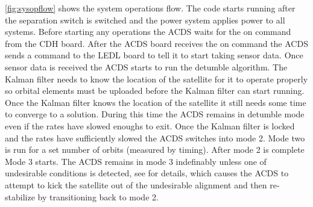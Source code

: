 \autoref{fig:sysopflow} shows the system operations flow. The code starts running after the separation switch is switched and the power system applies power to all systems. Before starting any operations the \ac{ACDS} waits for the on command from the \ac{CDH} board. After the \ac{ACDS} board receives the on command the \ac{ACDS} sends a command to the \ac{LEDL} board to tell it to start taking sensor data. Once sensor data is received the \ac{ACDS} starts to run the detumble algorithm. The Kalman filter needs to know the location of the satellite for it to operate properly so orbital elements must be uploaded before the Kalman filter can start running. Once the Kalman filter knows the location of the satellite it still needs some time to converge to a solution. During this time the \ac{ACDS} remains in detumble mode even if the rates have slowed enoughs to exit. Once the Kalman filter is locked and the rates have sufficiently slowed the \ac{ACDS} switches into mode 2. Mode two is run for a set number  of orbits (measured by timing). After mode 2 is complete Mode 3 starts. The \ac{ACDS} remains in mode 3 indefinably unless one of undesirable conditions is detected, see \cite{Mentch11} for details, which causes the \ac{ACDS} to attempt to kick the satellite out of the undesirable alignment and then re-stabilize by transitioning back to mode 2.

